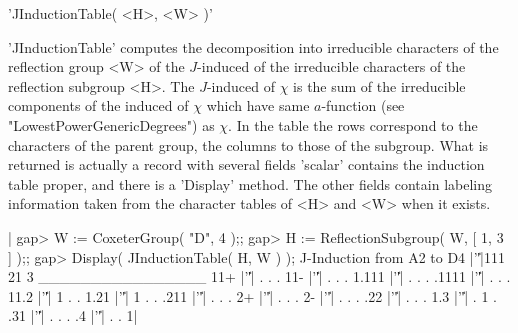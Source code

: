 
'JInductionTable( <H>, <W> )'

'JInductionTable' computes the decomposition into irreducible characters
of  the reflection  group  <W>  of the  $J$-induced  of the  irreducible
characters of the reflection subgroup  <H>. The $J$-induced of $\chi$ is
the sum  of the irreducible  components of  the induced of  $\chi$ which
have same  $a$-function (see "LowestPowerGenericDegrees") as  $\chi$. In
the table the rows correspond to the characters of the parent group, the
columns to those of the subgroup.  What is returned is actually a record
with  several fields\:  'scalar'  contains the  induction table  proper,
and  there is  a 'Display'  method.  The other  fields contain  labeling
information  taken from  the character  tables of  <H> and  <W> when  it
exists.

|    gap> W := CoxeterGroup( "D", 4 );;
    gap> H := ReflectionSubgroup( W, [ 1, 3 ] );;
    gap> Display( JInductionTable( H, W ) );
    J-Induction from A2 to D4
          |'\|'|111 21 3
    ________________
    11+   |'\|'|  .  . .
    11-   |'\|'|  .  . .
    1.111 |'\|'|  .  . .
    .1111 |'\|'|  .  . .
    11.2  |'\|'|  1  . .
    1.21  |'\|'|  1  . .
    .211  |'\|'|  .  . .
    2+    |'\|'|  .  . .
    2-    |'\|'|  .  . .
    .22   |'\|'|  .  . .
    1.3   |'\|'|  .  1 .
    .31   |'\|'|  .  . .
    .4    |'\|'|  .  . 1|

